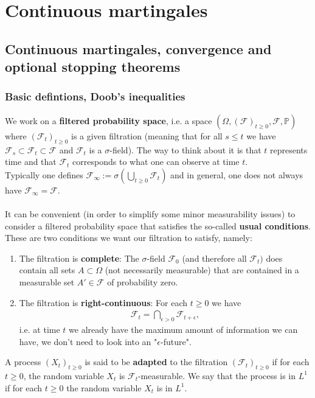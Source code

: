 \documentclass[../mainfile.tex]{subfiles}
\begin{document}
\section{Continuous martingales}
\subsection{Continuous martingales, convergence and optional stopping theorems}
\subsubsection{Basic defintions, Doob's inequalities}
We work on a \textbf{filtered probability space}, i.e. a space $(\Omega, (\mathcal{F})_{t \geq 0} , \mathcal{F}, \mathbb{P})$ where $(\mathcal{F}_t)_{t \geq 0}$ is a given filtration (meaning that for all $s \leq t$ we have $\mathcal{F}_s \subset \mathcal{F}_t \subset \mathcal{F}$ and $\mathcal{F}_t$ is a $\sigma$-field). The way to think about it is that $t$ represents time and that $\mathcal{F}_t$ corresponds to what one can observe at time $t$.
\\
Typically one defines $\mathcal{F}_\infty := \sigma( \bigcup_{t \geq 0} \mathcal{F}_t)$ and in general, one does not always have $\mathcal{F}_\infty = \mathcal{F}.$ \\
\\
It can be convenient (in order to simplify some minor measurability issues) to consider a filtered probability space that satisfies the so-called \textbf{usual conditions}. These are two conditions we want our filtration to satisfy, namely:
\begin{enumerate}
\item The filtration is \textbf{complete}: The $\sigma$-field $\mathcal{F}_0$ (and therefore all $\mathcal{F}_t)$ does contain all sets $A \subset \Omega$ (not necessarily measurable) that are contained in a measurable set $A' \in \mathcal{F}$ of probability zero. 
\item The filtration is \textbf{right-continuous}: For each $t \geq 0$ we have 
\begin{align*}
\mathcal{F}_t = \bigcap_{\epsilon >0} \mathcal{F}_{t + \epsilon},
\end{align*}
i.e. at time $t$ we already have the maximum amount of information we can have, we don't need to look into an "$\epsilon$-future".
\end{enumerate}
\begin{defn} A process $(X_t)_{t \geq 0}$ is said to be \textbf{adapted} to the filtration $( \mathcal{F}_t)_{t \geq 0}$ if for each $t \geq 0$, the random variable $X_t$ is $\mathcal{F}_t$-measurable. We say that the process is in $L^1$ if for each $t \geq 0$ the random variable $X_t$ is in $L^1$.  
\end{defn}
\end{document}
